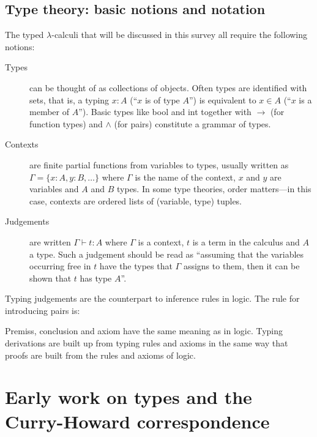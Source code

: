 \documentclass[12pt,toc=bibliography,numbers=noendperiod,
               footnotes=multiple,twoside]{scrartcl}
\begin{document}
\subsection{Type theory: basic notions and notation}

The typed \(\lambda\)-calculi that will be discussed in this survey all require the following notions:

\begin{description}
\item[Types] can be thought of as collections of objects. Often types are identified with sets, that is, a typing \(x:A\) (\enquote{\(x\) is of type \(A\)}) is equivalent to \(x \in A\) (\enquote{\(x\) is a member of \(A\)}). Basic types like bool and int together with \(\rightarrow\) (for function types) and \(\wedge\) (for pairs) constitute a grammar of types.
\item[Contexts] are finite partial functions from variables to types, usually written as \(\Gamma = \{x:A,y:B,\dots\}\) where \(\Gamma\) is the name of the context, \(x\) and \(y\) are variables and \(A\) and \(B\) types. In some type theories, order matters---in this case, contexts are ordered lists of (variable, type) tuples.
\item[Judgements] are written \(\Gamma \vdash t:A\) where \(\Gamma\) is a context, \(t\) is a term in the calculus and \(A\) a type. Such a judgement should be read as \enquote{assuming that the variables occurring free in \(t\) have the types that \(\Gamma\) assigns to them, then it can be shown that \(t\) has type \(A\)}.
\end{description}

Typing judgements are the counterpart to inference rules in logic. The rule for introducing pairs is:

\begin{figure}[h]
\begin{prooftree}
\end{prooftree}
\end{figure}

Premiss, conclusion and axiom have the same meaning as in logic. Typing derivations are built up from typing rules and axioms in the same way that proofs are built from the rules and axioms of logic.

\section{Early work on types and the Curry-Howard correspondence}
\end{document}
